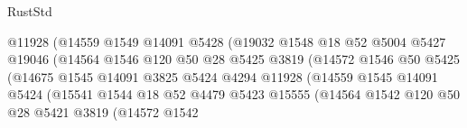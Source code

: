 \begin{lexlean}{RustStd}
\begin{coremodule}
                                      @11928
                                      (@14559
                                        @1549
                                        @14091
                                        @5428
                                        (@19032
                                          @1548
                                          @18
                                          @52
                                          @5004
                                          @5427
                                          @19046
                                          (@14564
                                            @1546
                                            @120
                                            @50
                                            @28
                                            @5425
                                            @3819
                                            (@14572
                                              @1546
                                              @50
                                              @5425
                                              (@14675
                                                @1545
                                                @14091
                                                @3825
                                                @5424
                                                @4294
                                                @11928
                                                (@14559
                                                  @1545
                                                  @14091
                                                  @5424
                                                  (@15541
                                                    @1544
                                                    @18
                                                    @52
                                                    @4479
                                                    @5423
                                                    @15555
                                                    (@14564
                                                      @1542
                                                      @120
                                                      @50
                                                      @28
                                                      @5421
                                                      @3819
                                                      (@14572
                                                        @1542

\end{coremodule}
\end{lexlean}
